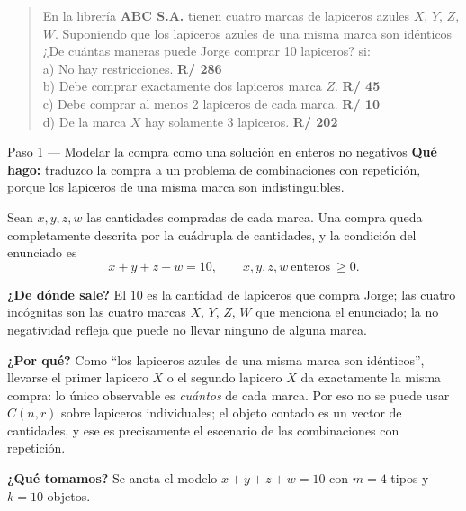 \documentclass[11pt]{article}
\begin{document}
\begin{quote}
En la librería \textbf{ABC S.A.} tienen cuatro marcas de lapiceros azules $X$, $Y$, $Z$, $W$. Suponiendo que los lapiceros azules de una misma marca son idénticos ¿De cuántas maneras puede Jorge comprar 10 lapiceros? si:\\[2pt]
a) No hay restricciones. \quad \textbf{R/ 286}\\
b) Debe comprar exactamente dos lapiceros marca $Z$. \quad \textbf{R/ 45}\\
c) Debe comprar al menos 2 lapiceros de cada marca. \quad \textbf{R/ 10}\\
d) De la marca $X$ hay solamente 3 lapiceros. \quad \textbf{R/ 202}
\end{quote}

\begin{paso}{Paso 1 --- Modelar la compra como una solución en enteros no negativos}
\textbf{Qué hago:} traduzco la compra a un problema de combinaciones con repetición, porque los lapiceros de una misma marca son indistinguibles.

Sean $x,y,z,w$ las cantidades compradas de cada marca. Una compra queda completamente descrita por la cuádrupla de cantidades, y la condición del enunciado es
\[
  x+y+z+w = 10,\qquad x,y,z,w\ \text{enteros}\ \ge 0 .
\]

\textbf{¿De dónde sale?} El $10$ es la cantidad de lapiceros que compra Jorge; las cuatro incógnitas son las cuatro marcas $X$, $Y$, $Z$, $W$ que menciona el enunciado; la no negatividad refleja que puede no llevar ninguno de alguna marca.

\textbf{¿Por qué?} Como ``los lapiceros azules de una misma marca son idénticos'', llevarse el primer lapicero $X$ o el segundo lapicero $X$ da exactamente la misma compra: lo único observable es \emph{cuántos} de cada marca. Por eso no se puede usar $C(n,r)$ sobre lapiceros individuales; el objeto contado es un vector de cantidades, y ese es precisamente el escenario de las combinaciones con repetición.

\textbf{¿Qué tomamos?} Se anota el modelo $x+y+z+w=10$ con $m=4$ tipos y $k=10$ objetos.
\end{paso}
\end{document}
